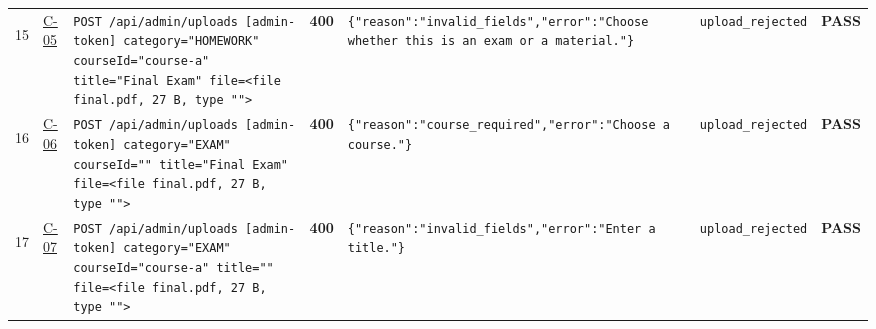 \documentclass[10pt,a4paper]{article}
\begin{document}
\begin{landscape}
\begin{longtable}{@{}P{0.6cm}P{0.9cm}P{8.5cm}P{1.0cm}P{6.2cm}P{4.2cm}P{1.1cm}@{}}
\hypertarget{call15}{15} & \hyperlink{test-C-05}{C-05} & \texttt{POST /\allowbreak{}api/\allowbreak{}admin/\allowbreak{}uploads [admin-\allowbreak{}token] category=\allowbreak{}"\allowbreak{}HOMEWORK"\allowbreak{} courseId=\allowbreak{}"\allowbreak{}course-\allowbreak{}a"\allowbreak{} title=\allowbreak{}"\allowbreak{}Final Exam"\allowbreak{} file=\allowbreak{}<file final.\allowbreak{}pdf,\allowbreak{} 27 B,\allowbreak{} type "\allowbreak{}"\allowbreak{}>} & \textcolor{warnamber}{\textbf{400}} & \texttt{\{"\allowbreak{}reason"\allowbreak{}:\allowbreak{}"\allowbreak{}invalid\_\allowbreak{}fields"\allowbreak{},\allowbreak{}"\allowbreak{}error"\allowbreak{}:\allowbreak{}"\allowbreak{}Choose whether this is an exam or a material.\allowbreak{}"\allowbreak{}\}} & \texttt{upload\_\allowbreak{}rejected} & \textcolor{passgreen}{\textbf{PASS}} \\
\hypertarget{call16}{16} & \hyperlink{test-C-06}{C-06} & \texttt{POST /\allowbreak{}api/\allowbreak{}admin/\allowbreak{}uploads [admin-\allowbreak{}token] category=\allowbreak{}"\allowbreak{}EXAM"\allowbreak{} courseId=\allowbreak{}"\allowbreak{}"\allowbreak{} title=\allowbreak{}"\allowbreak{}Final Exam"\allowbreak{} file=\allowbreak{}<file final.\allowbreak{}pdf,\allowbreak{} 27 B,\allowbreak{} type "\allowbreak{}"\allowbreak{}>} & \textcolor{warnamber}{\textbf{400}} & \texttt{\{"\allowbreak{}reason"\allowbreak{}:\allowbreak{}"\allowbreak{}course\_\allowbreak{}required"\allowbreak{},\allowbreak{}"\allowbreak{}error"\allowbreak{}:\allowbreak{}"\allowbreak{}Choose a course.\allowbreak{}"\allowbreak{}\}} & \texttt{upload\_\allowbreak{}rejected} & \textcolor{passgreen}{\textbf{PASS}} \\
\hypertarget{call17}{17} & \hyperlink{test-C-07}{C-07} & \texttt{POST /\allowbreak{}api/\allowbreak{}admin/\allowbreak{}uploads [admin-\allowbreak{}token] category=\allowbreak{}"\allowbreak{}EXAM"\allowbreak{} courseId=\allowbreak{}"\allowbreak{}course-\allowbreak{}a"\allowbreak{} title=\allowbreak{}"\allowbreak{}"\allowbreak{} file=\allowbreak{}<file final.\allowbreak{}pdf,\allowbreak{} 27 B,\allowbreak{} type "\allowbreak{}"\allowbreak{}>} & \textcolor{warnamber}{\textbf{400}} & \texttt{\{"\allowbreak{}reason"\allowbreak{}:\allowbreak{}"\allowbreak{}invalid\_\allowbreak{}fields"\allowbreak{},\allowbreak{}"\allowbreak{}error"\allowbreak{}:\allowbreak{}"\allowbreak{}Enter a title.\allowbreak{}"\allowbreak{}\}} & \texttt{upload\_\allowbreak{}rejected} & \textcolor{passgreen}{\textbf{PASS}} \\

\end{longtable}
\end{landscape}
\end{document}
